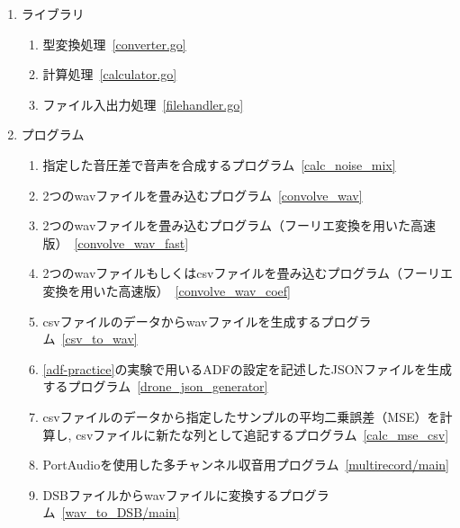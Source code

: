 \begin{enumerate}
\renewcommand{\labelenumi}{(\arabic{enumi})}
\tightlist

\item
  ライブラリ \\
  \begin{enumerate}
  \renewcommand{\labelenumi}{(\arabic{enumi})}
  \tightlist
  \item
    型変換処理\ \ref{converter.go}

  \item
    計算処理\  \ref{calculator.go}

  \item
    ファイル入出力処理\ \ref{filehandler.go}
  \end{enumerate}

\item
  プログラム

  \begin{enumerate}
  \renewcommand{\labelenumi}{(\arabic{enumi})}

  \item
    指定した音圧差で音声を合成するプログラム\ \ref{calc_noise_mix}

  \item
    2つのwavファイルを畳み込むプログラム\ \ref{convolve_wav}

  \item
    2つのwavファイルを畳み込むプログラム（フーリエ変換を用いた高速版）\ \ref{convolve_wav_fast}

  \item
    2つのwavファイルもしくはcsvファイルを畳み込むプログラム（フーリエ変換を用いた高速版）\ \ref{convolve_wav_coef}

  \item
    csvファイルのデータからwavファイルを生成するプログラム\ \ref{csv_to_wav}

  \item
    \ref{adf-practice}の実験で用いるADFの設定を記述したJSONファイルを生成するプログラム\ \ref{drone_json_generator}

  \item
    csvファイルのデータから指定したサンプルの平均二乗誤差（MSE）を計算し, csvファイルに新たな列として追記するプログラム\ \ref{calc_mse_csv}

  \item
    PortAudioを使用した多チャンネル収音用プログラム\ \ref{multirecord/main}

  \item
    DSBファイルからwavファイルに変換するプログラム\ \ref{wav_to_DSB/main}
  \end{enumerate}
\end{enumerate}


